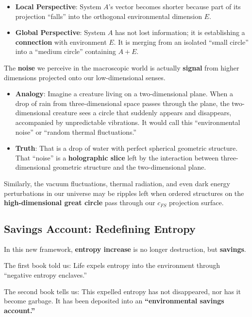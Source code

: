 \begin{itemize}
\item \textbf{Local Perspective}: System $A$'s vector becomes shorter because part of its projection ``falls'' into the orthogonal environmental dimension $E$.

\item \textbf{Global Perspective}: System $A$ has not lost information; it is establishing a \textbf{connection} with environment $E$. It is merging from an isolated ``small circle'' into a ``medium circle'' containing $A+E$.
\end{itemize}

The \textbf{noise} we perceive in the macroscopic world is actually \textbf{signal} from higher dimensions projected onto our low-dimensional senses.

\begin{itemize}
\item \textbf{Analogy}: Imagine a creature living on a two-dimensional plane. When a drop of rain from three-dimensional space passes through the plane, the two-dimensional creature sees a circle that suddenly appears and disappears, accompanied by unpredictable vibrations. It would call this ``environmental noise'' or ``random thermal fluctuations.''

\item \textbf{Truth}: That is a drop of water with perfect spherical geometric structure. That ``noise'' is a \textbf{holographic slice} left by the interaction between three-dimensional geometric structure and the two-dimensional plane.
\end{itemize}

Similarly, the vacuum fluctuations, thermal radiation, and even dark energy perturbations in our universe may be ripples left when ordered structures on the \textbf{high-dimensional great circle} pass through our $c_{FS}$ projection surface.

\subsection{Savings Account: Redefining Entropy}

In this new framework, \textbf{entropy increase} is no longer destruction, but \textbf{savings}.

The first book told us: Life expels entropy into the environment through ``negative entropy enclaves.''

The second book tells us: This expelled entropy has not disappeared, nor has it become garbage. It has been deposited into an \textbf{``environmental savings account.''}

